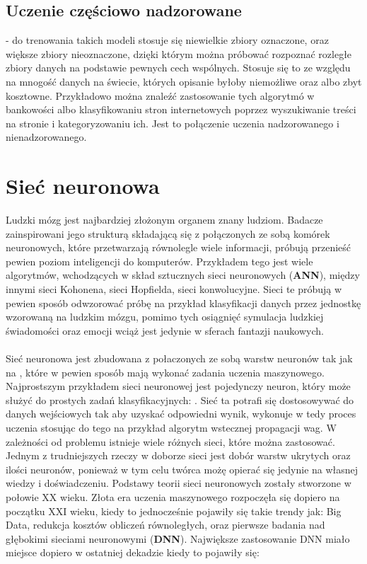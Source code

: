     \subsection{Uczenie częściowo nadzorowane} - do trenowania takich modeli stosuje się niewielkie zbiory oznaczone, oraz większe zbiory nieoznaczone, dzięki którym można próbować rozpoznać rozległe zbiory danych na podstawie pewnych cech wspólnych. Stosuje się to ze względu na mnogość danych na świecie, których opisanie byłoby niemożliwe oraz albo zbyt kosztowne. Przykładowo można znaleźć zastosowanie tych algorytmó w bankowości albo klasyfikowaniu stron internetowych poprzez wyszukiwanie treści na stronie i kategoryzowaniu ich\cite{semiLinkedin}. Jest to połączenie uczenia nadzorowanego i nienadzorowanego\cite{Mahesh2018}.

\section{Sieć neuronowa}
\label{sec:snn}
Ludzki mózg jest najbardziej złożonym organem znany ludziom. Badacze zainspirowani jego strukturą składającą się z połączonych ze sobą komórek neuronowych, które przetwarzają równolegle wiele informacji, próbują przenieść pewien poziom inteligencji do komputerów. Przykładem tego jest wiele algorytmów, wchodzących w skład sztucznych sieci neuronowych (\textbf{ANN}), między innymi sieci Kohonena, sieci Hopfielda, sieci konwolucyjne. Sieci te próbują w pewien sposób odwzorować próbę na przykład klasyfikacji danych przez jednostkę wzorowaną na ludzkim mózgu, pomimo tych osiągnięć symulacja ludzkiej świadomości oraz emocji wciąż jest jedynie w sferach fantazji naukowych\cite{Wang2003}.
\\ \\
Sieć neuronowa jest zbudowana z połaczonych ze sobą warstw neuronów tak jak na , które w pewien sposób mają wykonać zadania uczenia maszynowego. Najprostszym przykładem sieci neuronowej jest pojedynczy neuron, który może służyć do prostych zadań klasyfikacyjnych: . Sieć ta potrafi się dostosowywać do danych wejściowych tak aby uzyskać odpowiedni wynik, wykonuje w tedy proces uczenia stosując do tego na przykład algorytm wstecznej propagacji wag. W zależności od problemu istnieje wiele różnych sieci, które można zastosować. Jednym z trudniejszych rzeczy w doborze sieci jest dobór warstw ukrytych oraz ilości neuronów, ponieważ w tym celu twórca możę opierać się jedynie na własnej wiedzy i doświadczeniu. Podstawy teorii sieci neuronowych zostały stworzone w połowie XX wieku. Złota era uczenia maszynowego rozpoczęła się dopiero na początku XXI wieku, kiedy to jednocześnie pojawiły się takie trendy jak: Big Data, redukcja kosztów obliczeń równoległych, oraz pierwsze badania nad głębokimi sieciami neuronowymi (\textbf{DNN}). Największe zastosowanie DNN miało miejsce dopiero w ostatniej dekadzie kiedy to pojawiły się:
